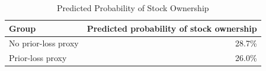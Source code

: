\begin{table}[!h]
\centering
\caption{Predicted Probability of Stock Ownership}
\centering
\fontsize{10}{12}\selectfont
\begin{tabular}[t]{lr}
\toprule
Group & Predicted probability of stock ownership\\
\midrule
No prior-loss proxy & 28.7\%\\
Prior-loss proxy & 26.0\%\\
\bottomrule
\end{tabular}
\end{table}
